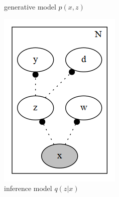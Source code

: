 \documentclass[final]{beamer}
\begin{document}
\begin{frame}
\begin{figure}[h]
\begin{subfigure}[b]{0.2\textwidth}
\caption{generative model $p(x,z)$}
\end{subfigure}
\begin{subfigure}[b]{0.2\textwidth}
\includegraphics[width=\textwidth]{plots/dirichlet_gmm_q.gv.png}
\caption{inference model $q(z|x)$}
\end{subfigure}
\begin{subfigure}[b]{0.4\textwidth}

\end{subfigure}
\end{figure}
\end{frame}
\end{document}
